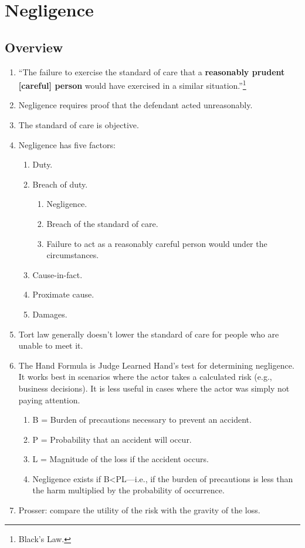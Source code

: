 \section{Negligence}

\subsection{Overview}

\begin{enumerate}
    \item ``The failure to exercise the standard of care that a \textbf{reasonably prudent [careful] person} would have exercised in a similar situation.''\footnote{Black's Law.}
    \item Negligence requires proof that the defendant acted unreasonably.
    \item The standard of care is objective.
    \item Negligence has five factors:
    \begin{enumerate}
        \item Duty.
        \item Breach of duty.
        \begin{enumerate}
            \item Negligence.
            \item Breach of the standard of care.
            \item Failure to act as a reasonably careful person would under the circumstances.
        \end{enumerate}
        \item Cause-in-fact.
        \item Proximate cause.
        \item Damages.
    \end{enumerate}
    \item Tort law generally doesn't lower the standard of care for people who are unable to meet it.
    \item The Hand Formula is Judge Learned Hand's test for determining negligence. It works best in scenarios where the actor takes a calculated risk (e.g., business decisions). It is less useful in cases where the actor was simply not paying attention.
    \begin{enumerate}
        \item B = Burden of precautions necessary to prevent an accident.
        \item P = Probability that an accident will occur.
        \item L = Magnitude of the loss if the accident occurs.
        \item Negligence exists if B\textless PL---i.e., if the burden of precautions is less than the harm multiplied by the probability of occurrence.
    \end{enumerate}
    \item Prosser: compare the utility of the risk with the gravity of the loss.
\end{enumerate}

